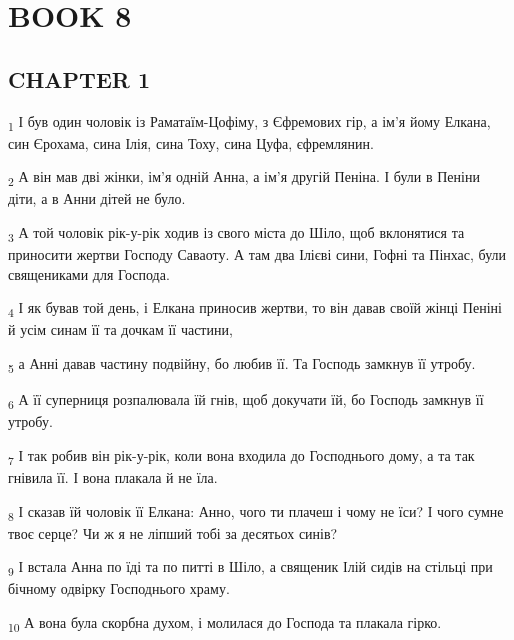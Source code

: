 \section{BOOK 8}
\subsection{CHAPTER 1}
\begin{tcolorbox}
\textsubscript{1} І був один чоловік із Раматаїм-Цофіму, з Єфремових гір, а ім'я йому Елкана, син Єрохама, сина Ілія, сина Тоху, сина Цуфа, єфремлянин.
\end{tcolorbox}
\begin{tcolorbox}
\textsubscript{2} А він мав дві жінки, ім'я одній Анна, а ім'я другій Пеніна. І були в Пеніни діти, а в Анни дітей не було.
\end{tcolorbox}
\begin{tcolorbox}
\textsubscript{3} А той чоловік рік-у-рік ходив із свого міста до Шіло, щоб вклонятися та приносити жертви Господу Саваоту. А там два Ілієві сини, Гофні та Пінхас, були священиками для Господа.
\end{tcolorbox}
\begin{tcolorbox}
\textsubscript{4} І як бував той день, і Елкана приносив жертви, то він давав своїй жінці Пеніні й усім синам її та дочкам її частини,
\end{tcolorbox}
\begin{tcolorbox}
\textsubscript{5} а Анні давав частину подвійну, бо любив її. Та Господь замкнув її утробу.
\end{tcolorbox}
\begin{tcolorbox}
\textsubscript{6} А її суперниця розпалювала їй гнів, щоб докучати їй, бо Господь замкнув її утробу.
\end{tcolorbox}
\begin{tcolorbox}
\textsubscript{7} І так робив він рік-у-рік, коли вона входила до Господнього дому, а та так гнівила її. І вона плакала й не їла.
\end{tcolorbox}
\begin{tcolorbox}
\textsubscript{8} І сказав їй чоловік її Елкана: Анно, чого ти плачеш і чому не їси? І чого сумне твоє серце? Чи ж я не ліпший тобі за десятьох синів?
\end{tcolorbox}
\begin{tcolorbox}
\textsubscript{9} І встала Анна по їді та по питті в Шіло, а священик Ілій сидів на стільці при бічному одвірку Господнього храму.
\end{tcolorbox}
\begin{tcolorbox}
\textsubscript{10} А вона була скорбна духом, і молилася до Господа та плакала гірко.
\end{tcolorbox}
